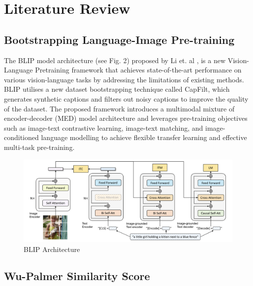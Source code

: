 \section{Literature Review}
\label{sec:formatting}

\subsection{Bootstrapping Language-Image Pre-training}
The BLIP model architecture (see Fig. 2) proposed by Li et. al \cite{li2022blip}, is a new Vision-Language Pretraining framework that achieves state-of-the-art performance on various vision-language tasks by addressing the limitations of existing methods. BLIP utilises a new dataset bootstrapping technique called CapFilt, which generates synthetic captions and filters out noisy captions to improve the quality of the dataset. The proposed framework introduces a multimodal mixture of encoder-decoder (MED) model architecture and leverages pre-training objectives such as image-text contrastive learning, image-text matching, and image-conditioned language modelling to achieve flexible transfer learning and effective multi-task pre-training.

\begin{figure}[htbp]
  \centering
   \includegraphics[width=\linewidth]{sec/Images/image2.png}
   \caption{BLIP Architecture}
   \label{fig:onecol}
\end{figure}

\subsection{Wu-Palmer Similarity Score}

